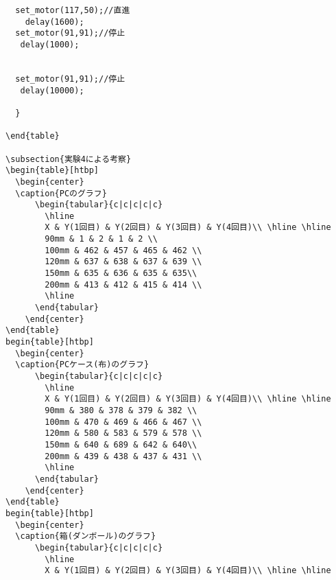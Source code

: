 \documentclass{jsarticle}
\begin{document}
\begin{verbatim}
  set_motor(117,50);//直進
    delay(1600);
  set_motor(91,91);//停止
   delay(1000);


  set_motor(91,91);//停止
   delay(10000);

  }

\end{table}

\subsection{実験4による考察}
\begin{table}[htbp]
  \begin{center}
  \caption{PCのグラフ}
      \begin{tabular}{c|c|c|c|c}
        \hline
        X & Y(1回目) & Y(2回目) & Y(3回目) & Y(4回目)\\ \hline \hline
        90mm & 1 & 2 & 1 & 2 \\
        100mm & 462 & 457 & 465 & 462 \\
        120mm & 637 & 638 & 637 & 639 \\
        150mm & 635 & 636 & 635 & 635\\
        200mm & 413 & 412 & 415 & 414 \\
        \hline
      \end{tabular}
    \end{center}
\end{table}
begin{table}[htbp]
  \begin{center}
  \caption{PCケース(布)のグラフ}
      \begin{tabular}{c|c|c|c|c}
        \hline
        X & Y(1回目) & Y(2回目) & Y(3回目) & Y(4回目)\\ \hline \hline
        90mm & 380 & 378 & 379 & 382 \\
        100mm & 470 & 469 & 466 & 467 \\
        120mm & 580 & 583 & 579 & 578 \\
        150mm & 640 & 689 & 642 & 640\\
        200mm & 439 & 438 & 437 & 431 \\
        \hline
      \end{tabular}
    \end{center}
\end{table}
begin{table}[htbp]
  \begin{center}
  \caption{箱(ダンボール)のグラフ}
      \begin{tabular}{c|c|c|c|c}
        \hline
        X & Y(1回目) & Y(2回目) & Y(3回目) & Y(4回目)\\ \hline \hline

\end{verbatim}
\end{document}
